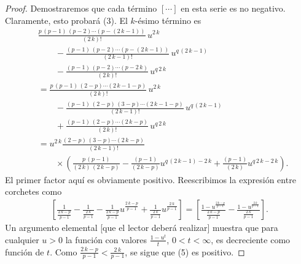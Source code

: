 \begin{proof}
    Demostraremos que cada término $[\cdots]$ en esta serie es no negativo. Claramente, esto probará (3). El $ k $-ésimo término es
    \begin{align}
        &\frac{p\,(p-1)\,(p-2)\cdots(p-(2\,k-1))}{(2\,k)!}\,u^{2\,k} \\
        &\qquad - \frac{(p-1)\,(p-2)\cdots(p-(2\,k-1))}{(2\,k-1)!}\,u^{q\,(2\,k-1)} \\
        &\qquad - \frac{(p-1)\,(p-2)\cdots(p-2\,k)}{(2\,k)!}\,u^{q\,2\,k} \\
        &= \frac{p\,(p-1)\,(2-p)\cdots(2\,k-1-p)}{(2\,k)!}\,u^{2\,k} \\
        &\qquad - \frac{(p-1)\,(2-p)\,(3-p)\cdots(2\,k-1-p)}{(2\,k-1)!}\,u^{q\,(2\,k-1)} \\
        &\qquad + \frac{(p-1)\,(2-p)\cdots(2\,k-p)}{(2\,k)!}\,u^{q\,2\,k} \\
        &= u^{2\,k} \frac{(2-p)\,(3-p)\cdots(2\,k-p)}{(2\,k-1)!} \\
        &\qquad \times \left(\frac{p\,(p-1)}{(2\,k)\,(2\,k-p)} - \frac{(p-1)}{(2\,k-p)} u^{q\,(2\,k-1) - 2\,k} + \frac{(p-1)}{(2\,k)} u^{q\,2\,k - 2\,k}\right).
    \end{align}
    El primer factor aquí es obviamente positivo. Reescribimos la expresión entre corchetes como
    \begin{align}
        \left[\frac{1}{\frac{2\,k-p}{p-1}} - \frac{1}{\frac{2\,k}{p-1}} - \frac{1}{\frac{2\,k-p}{p-1}} u^{\frac{2\,k-p}{p-1}} + \frac{1}{\frac{2\,k}{p-1}} u^{\frac{2\,k}{p-1}}\right]
        = \left[\frac{1 - u^{\frac{2\,k-p}{p-1}}}{\frac{2\,k-p}{p-1}} - \frac{1 - u^{\frac{2\,k}{p-1}}}{\frac{2\,k}{p-1}}\right].
    \end{align}
    Un argumento elemental [que el lector deberá realizar] muestra que para cualquier $ u > 0 $ la función con valores $ \frac{1-u^{t}}{t} $, $ 0 < t < \infty $, es decreciente como función de $ t $. Como $ \frac{2\,k-p}{p-1} < \frac{2\,k}{p-1} $, se sigue que (5) es positivo.
\end{proof}

